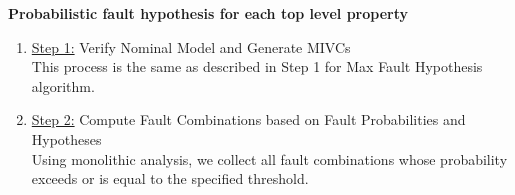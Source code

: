 \textbf{Probabilistic fault hypothesis for each top level property}
\begin{enumerate}[label=(\roman*)]
\item \underline{Step 1:} Verify Nominal Model and Generate MIVCs \\

This process is the same as described in Step 1 for Max Fault Hypothesis algorithm.\\




\item \underline{Step 2:} Compute Fault Combinations based on Fault Probabilities and Hypotheses \\

Using monolithic analysis, we collect all fault combinations whose probability exceeds or is equal to the specified threshold. \\


\end{enumerate}
